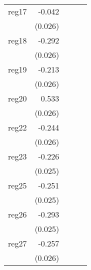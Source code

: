 {\begin{longtable}{l*{4}{D{.}{.}{-1}}}
\addlinespace
reg17       &      -0.042         &                     &                     &                     \\
            &     (0.026)         &                     &                     &                     \\
\addlinespace
reg18       &      -0.292\sym{***}&                     &                     &                     \\
            &     (0.026)         &                     &                     &                     \\
\addlinespace
reg19       &      -0.213\sym{***}&                     &                     &                     \\
            &     (0.026)         &                     &                     &                     \\
\addlinespace
reg20       &       0.533\sym{***}&                     &                     &                     \\
            &     (0.026)         &                     &                     &                     \\
\addlinespace
reg22       &      -0.244\sym{***}&                     &                     &                     \\
            &     (0.026)         &                     &                     &                     \\
\addlinespace
reg23       &      -0.226\sym{***}&                     &                     &                     \\
            &     (0.025)         &                     &                     &                     \\
\addlinespace
reg25       &      -0.251\sym{***}&                     &                     &                     \\
            &     (0.025)         &                     &                     &                     \\
\addlinespace
reg26       &      -0.293\sym{***}&                     &                     &                     \\
            &     (0.025)         &                     &                     &                     \\
\addlinespace
reg27       &      -0.257\sym{***}&                     &                     &                     \\
            &     (0.026)         &                     &                     &                     \\

\end{longtable}}
